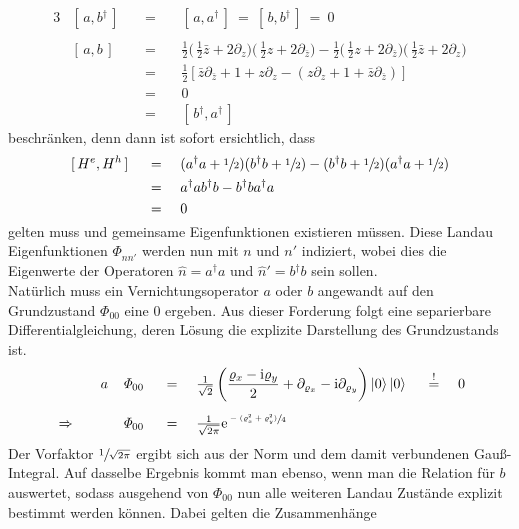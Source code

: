 \documentclass[a4paper,11pt]{article}
\newcommand{\ind}[2]{{_{#1}^{#2}}}
\newcommand{\+}{\dagger}
\newcommand{\ck}{\left |}
\newcommand{\ket}{\right \rangle}
\newcommand{\com}[2]{[\, #1, #2 \,]}
\renewcommand{\exp}[1]{\tt{e}^{#1}}
\renewcommand{\it}{\mathit}
\renewcommand{\^}{\hat}
\renewcommand{\tt}{\text}
\renewcommand{\~}{\widetilde}
\begin{document}
\begin{alignat*}{3}
& \com{a}{b\ind{}{\+}} && \ = \ &&\com{a}{a\ind{}{\+}}\ =\ \com{b}{b\ind{}{\+}}\ =\ 0 \\ \\
& \com{a}{b} &&\ =\ && \frac{1}{2}\Big(\,\frac{1}{2}\bar z + 2\partial_{z}\Big)\Big(\,\frac{1}{2}z + 2\partial_{\bar z}\Big) -\frac{1}{2}\Big(\,\frac{1}{2}z + 2\partial_{\bar z}\Big)\Big(\,\frac{1}{2}\bar z + 2\partial_{ z}\Big)\\[3pt]
& &&\ =\ && \frac{1}{2}[\bar z \partial_{\bar z}+1 +z\partial_z - (z \partial_{ z}+1 +\bar z\partial_{\bar z})] \\[3pt]
& &&\ =\ && 0 \\
& &&\ =\ && \com{b\ind{}{\+}}{a\ind{}{\+}}
\end{alignat*}
beschränken, denn dann ist sofort ersichtlich, dass 
\begin{alignat*}{3}
& \com{H\ind{}{e}}{H\ind{}{h}} &&\ =\ && (a\ind{}{\+}a+\sfrac{1}{2})(b\ind{}{\+}b+\sfrac{1}{2})-(b\ind{}{\+}b+\sfrac{1}{2})(a\ind{}{\+}a+\sfrac{1}{2}) \\
& &&\ = \ && a\ind{}{\+}ab\ind{}{\+}b - b\ind{}{\+}ba\ind{}{\+}a \\
& &&\ = \ && 0
\end{alignat*}
gelten muss und gemeinsame Eigenfunktionen existieren müssen. Diese Landau Eigenfunktionen $\it{\Phi}\ind{nn'}{}$ werden nun mit $n$ und $n'$ indiziert, wobei dies die Eigenwerte der Operatoren $\^ n = a\ind{}{\+}a$ und $\^n '= b\ind{}{\+}b $ sein sollen. \\
Natürlich muss ein Vernichtungsoperator $a$ oder $b$ angewandt auf den Grundzustand $\it{\Phi}_{00}$ eine $0$ ergeben. Aus dieser Forderung folgt eine separierbare Differentialgleichung, deren Lösung die explizite Darstellung des Grundzustands ist. 
\begin{alignat*}{7}
& && a&&\it{\Phi}_{00} &&\ =\ && \tfrac{1}{\sqrt{2}}\left (\frac{\varrho_x -\tt i\varrho_y}{2}+\partial_{\varrho_x}-\tt i \partial_{\varrho_y}\right )\ck 0\ket \ck 0\ket &&\ \stackrel{!}{=} \ &&0 \\[5pt]
& \Rightarrow  \quad  && &&\it{\Phi}_{00} &&\ = \ && \tfrac{1}{\sqrt{2\pi}}\exp{\sfrac{-(\varrho_x ^2 + \varrho_y ^2)}{4}}
\end{alignat*}
Der Vorfaktor $\sfrac{1}{\sqrt{2\pi}}$ ergibt sich aus der Norm und dem damit verbundenen Gauß-Integral. Auf dasselbe Ergebnis kommt man ebenso, wenn man die Relation für $b$ auswertet, sodass ausgehend von $\it{\Phi}_{00}$ nun alle weiteren Landau Zustände explizit bestimmt werden können. Dabei gelten die Zusammenhänge 
\end{document}
